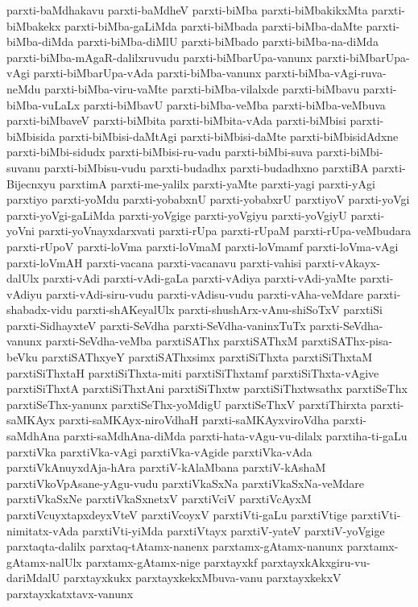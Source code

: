 {parxti-baMdhakavu
parxti-baMdheV
parxti-biMba
parxti-biMbakikxMta
parxti-biMbakekx
parxti-biMba-gaLiMda
parxti-biMbada
parxti-biMba-daMte
parxti-biMba-diMda
parxti-biMba-diMlU
parxti-biMbado
parxti-biMba-na-diMda
parxti-biMba-mAgaR-dalilxruvudu
parxti-biMbarUpa-vanunx
parxti-biMbarUpa-vAgi
parxti-biMbarUpa-vAda
parxti-biMba-vanunx
parxti-biMba-vAgi-ruva-neMdu
parxti-biMba-viru-vaMte
parxti-biMba-vilalxde
parxti-biMbavu
parxti-biMba-vuLaLx
parxti-biMbavU
parxti-biMba-veMba
parxti-biMba-veMbuva
parxti-biMbaveV
parxti-biMbita
parxti-biMbita-vAda
parxti-biMbisi
parxti-biMbisida
parxti-biMbisi-daMtAgi
parxti-biMbisi-daMte
parxti-biMbisidAdxne
parxti-biMbi-sidudx
parxti-biMbisi-ru-vadu
parxti-biMbi-suva
parxti-biMbi-suvanu
parxti-biMbisu-vudu
parxti-budadhx
parxti-budadhxno
parxtiBA
parxti-Bijecnxyu
parxtimA
parxti-me-yalilx
parxti-yaMte
parxti-yagi
parxti-yAgi
parxtiyo
parxti-yoMdu
parxti-yobabxnU
parxti-yobabxrU
parxtiyoV
parxti-yoVgi
parxti-yoVgi-gaLiMda
parxti-yoVgige
parxti-yoVgiyu
parxti-yoVgiyU
parxti-yoVni
parxti-yoVnayxdarxvati
parxti-rUpa
parxti-rUpaM
parxti-rUpa-veMbudara
parxti-rUpoV
parxti-loVma
parxti-loVmaM
parxti-loVmamf
parxti-loVma-vAgi
parxti-loVmAH
parxti-vacana
parxti-vacanavu
parxti-vahisi
parxti-vAkayx-dalUlx
parxti-vAdi
parxti-vAdi-gaLa
parxti-vAdiya
parxti-vAdi-yaMte
parxti-vAdiyu
parxti-vAdi-siru-vudu
parxti-vAdisu-vudu
parxti-vAha-veMdare
parxti-shabadx-vidu
parxti-shAKeyalUlx
parxti-shushArx-vAnu-shiSoTxV
parxtiSi
parxti-SidhayxteV
parxti-SeVdha
parxti-SeVdha-vaninxTuTx
parxti-SeVdha-vanunx
parxti-SeVdha-veMba
parxtiSAThx
parxtiSAThxM
parxtiSAThx-pisa-beVku
parxtiSAThxyeY
parxtiSAThxsimx
parxtiSiThxta
parxtiSiThxtaM
parxtiSiThxtaH
parxtiSiThxta-miti
parxtiSiThxtamf
parxtiSiThxta-vAgive
parxtiSiThxtA
parxtiSiThxtAni
parxtiSiThxtw
parxtiSiThxtwsathx
parxtiSeThx
parxtiSeThx-yanunx
parxtiSeThx-yoMdigU
parxtiSeThxV
parxtiThirxta
parxti-saMKAyx
parxti-saMKAyx-niroVdhaH
parxti-saMKAyxviroVdha
parxti-saMdhAna
parxti-saMdhAna-diMda
parxti-hata-vAgu-vu-dilalx
parxtiha-ti-gaLu
parxtiVka
parxtiVka-vAgi
parxtiVka-vAgide
parxtiVka-vAda
parxtiVkAnuyxdAja-hAra
parxtiV-kAlaMbana
parxtiV-kAshaM
parxtiVkoVpAsane-yAgu-vudu
parxtiVkaSxNa
parxtiVkaSxNa-veMdare
parxtiVkaSxNe
parxtiVkaSxnetxV
parxtiVciV
parxtiVcAyxM
parxtiVcuyxtapxdeyxVteV
parxtiVcoyxV
parxtiVti-gaLu
parxtiVtige
parxtiVti-nimitatx-vAda
parxtiVti-yiMda
parxtiVtayx
parxtiV-yateV
parxtiV-yoVgige
parxtaqta-dalilx
parxtaq-tAtamx-nanenx
parxtamx-gAtamx-nanunx
parxtamx-gAtamx-nalUlx
parxtamx-gAtamx-nige
parxtayxkf
parxtayxkAkxgiru-vu-dariMdalU
parxtayxkukx
parxtayxkekxMbuva-vanu
parxtayxkekxV
parxtayxkatxtavx-vanunx
}
